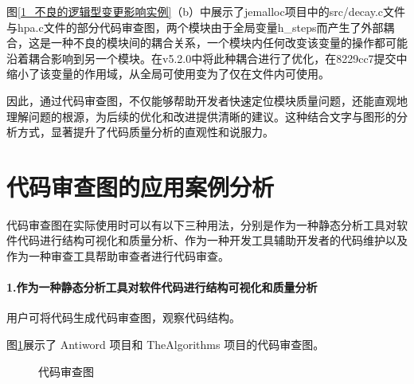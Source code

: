 图\ref{1_不良的逻辑型变更影响实例}（b）中展示了jemalloc项目中的src/decay.c文件与hpa.c文件的部分代码审查图，两个模块由于全局变量h\_steps而产生了外部耦合，这是一种不良的模块间的耦合关系，一个模块内任何改变该变量的操作都可能沿着耦合影响到另一个模块。在v5.2.0中将此种耦合进行了优化，在8229cc7提交中缩小了该变量的作用域，从全局可使用变为了仅在文件内可使用。


因此，通过代码审查图，不仅能够帮助开发者快速定位模块质量问题，还能直观地理解问题的根源，为后续的优化和改进提供清晰的建议。这种结合文字与图形的分析方式，显著提升了代码质量分析的直观性和说服力。


\section{代码审查图的应用案例分析}

代码审查图在实际使用时可以有以下三种用法，分别是作为一种静态分析工具对软件代码进行结构可视化和质量分析、作为一种开发工具辅助开发者的代码维护以及作为一种审查工具帮助审查者进行代码审查。

\paragraph{1.作为一种静态分析工具对软件代码进行结构可视化和质量分析} 用户可将代码生成代码审查图，观察代码结构。

图\ref{1_代码审查图}展示了 Antiword 项目和 TheAlgorithms 项目的代码审查图。

\begin{figure}[!h]
    \setlength{\subfigcapskip}{-1bp}
    \centering
    \begin{minipage}{\textwidth}
    \centering
    \hspace{2em}
    \end{minipage}
    \centering
    \begin{minipage}{\textwidth}
    \centering
    \hspace{2em}
    \end{minipage}
    \vspace{0.2em}
    \caption{代码审查图} %
    \label{1_代码审查图}
\end{figure}


